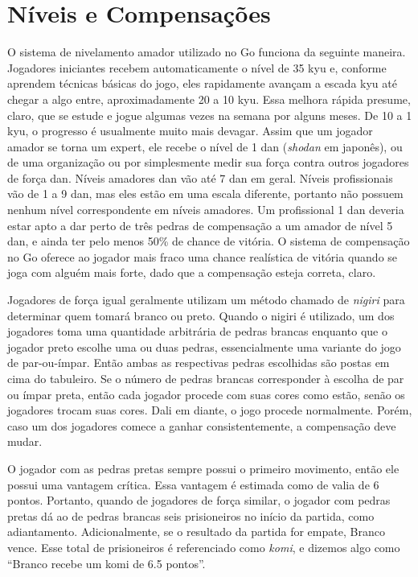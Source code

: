 \chapter{Níveis e Compensações}\label{chap:10:niveis_compensacoes}

O sistema de nivelamento amador utilizado no Go funciona da seguinte maneira. Jogadores iniciantes recebem automaticamente o nível de 35 kyu e, conforme aprendem técnicas básicas do jogo, eles rapidamente avançam a escada kyu até chegar a algo entre, aproximadamente 20 a 10 kyu. Essa melhora rápida presume, claro, que se estude e jogue algumas vezes na semana por alguns meses. De 10 a 1 kyu, o progresso é usualmente muito mais devagar. Assim que um jogador amador se torna um expert, ele recebe o nível de 1 dan (\emph{shodan} em japonês), ou de uma organização ou por simplesmente medir sua força contra outros jogadores de força dan. Níveis amadores dan vão até 7 dan em geral. Níveis profissionais vão de 1 a 9 dan, mas eles estão em uma escala diferente, portanto não possuem nenhum nível correspondente em níveis amadores. Um profissional 1 dan deveria estar apto a dar perto de três pedras de compensação a um amador de nível 5 dan, e ainda ter pelo menos 50\% de chance de vitória. O sistema de compensação no Go oferece ao jogador mais fraco uma chance realística de vitória quando se joga com alguém mais forte, dado que a compensação esteja correta, claro.

Jogadores de força igual geralmente utilizam um método chamado de \emph{nigiri} para determinar quem tomará branco ou preto. Quando o nigiri é utilizado, um dos jogadores toma uma quantidade arbitrária de pedras brancas enquanto que o jogador preto escolhe uma ou duas pedras, essencialmente uma variante do jogo de par-ou-ímpar. Então ambas as respectivas pedras escolhidas são postas em cima do tabuleiro. Se o número de pedras brancas corresponder à escolha de par ou ímpar preta, então cada jogador procede com suas cores como estão, senão os jogadores trocam suas cores. Dali em diante, o jogo procede normalmente. Porém, caso um dos jogadores comece a ganhar consistentemente, a compensação deve mudar.

O jogador com as pedras pretas sempre possui o primeiro movimento, então ele possui uma vantagem crítica. Essa vantagem é estimada como de valia de 6 pontos. Portanto, quando de jogadores de força similar, o jogador com pedras pretas dá ao de pedras brancas seis prisioneiros no início da partida, como adiantamento. Adicionalmente, se o resultado da partida for empate, Branco vence. Esse total de prisioneiros é referenciado como \emph{komi}, e dizemos algo como ``Branco recebe um komi de 6.5 pontos''.

